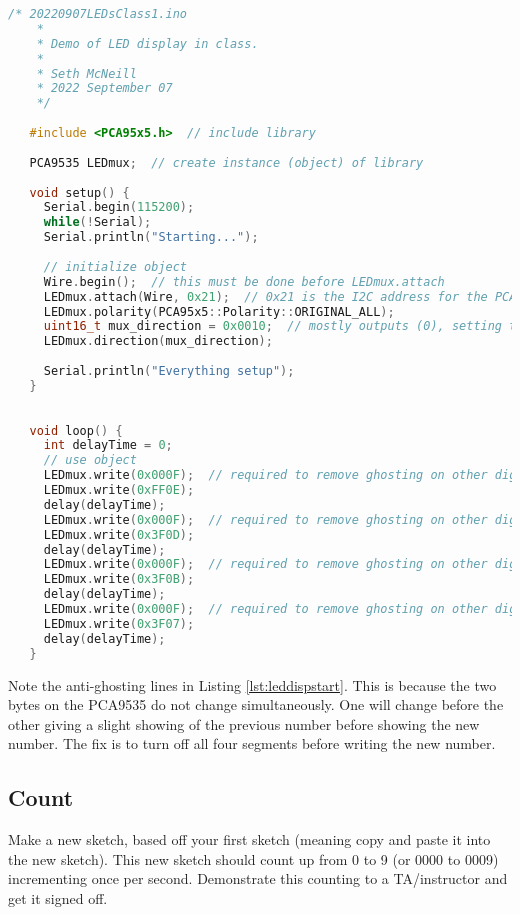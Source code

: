 \begin{lstlisting}[language=C++, caption={This listing is a starting point for driving the LED display. 
    This sketch may also be available on Canvas. Beware of copying out of PDFs since some characters
     (underscore for instance) come through garbled.},label={lst:leddispstart}]
    /* 20220907LEDsClass1.ino
    *  
    * Demo of LED display in class.
    * 
    * Seth McNeill
    * 2022 September 07
    */
   
   #include <PCA95x5.h>  // include library
   
   PCA9535 LEDmux;  // create instance (object) of library
   
   void setup() {
     Serial.begin(115200);
     while(!Serial);
     Serial.println("Starting...");
   
     // initialize object
     Wire.begin();  // this must be done before LEDmux.attach
     LEDmux.attach(Wire, 0x21);  // 0x21 is the I2C address for the PCA9535 attached to the LEDs
     LEDmux.polarity(PCA95x5::Polarity::ORIGINAL_ALL);
     uint16_t mux_direction = 0x0010;  // mostly outputs (0), setting to 1 designates input
     LEDmux.direction(mux_direction);
   
     Serial.println("Everything setup");
   }
   
   
   void loop() {
     int delayTime = 0;
     // use object
     LEDmux.write(0x000F);  // required to remove ghosting on other digits
     LEDmux.write(0xFF0E);
     delay(delayTime); 
     LEDmux.write(0x000F);  // required to remove ghosting on other digits
     LEDmux.write(0x3F0D);
     delay(delayTime); 
     LEDmux.write(0x000F);  // required to remove ghosting on other digits
     LEDmux.write(0x3F0B);
     delay(delayTime); 
     LEDmux.write(0x000F);  // required to remove ghosting on other digits
     LEDmux.write(0x3F07);
     delay(delayTime); 
   }
\end{lstlisting}
Note the anti-ghosting lines in Listing \ref{lst:leddispstart}. This is because the two
bytes on the PCA9535 do not change simultaneously. One will change before the other 
giving a slight showing of the previous number before showing the new number. The fix 
is to turn off all four segments before writing the new number.
    
\subsection{Count}
Make a new sketch, based off your first sketch (meaning copy and paste it into the new sketch).
This new sketch should count up from 0 to 9 (or 0000 to 0009) incrementing once per second. Demonstrate
this counting to a TA/instructor and get it signed off.

